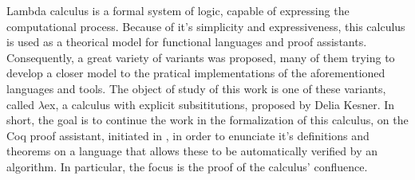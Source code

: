 Lambda calculus is a formal system of logic, capable of expressing the computational process.
Because of it's simplicity and expressiveness, this calculus is used as a theorical model
for functional languages and proof assistants. Consequently, a great variety of variants
was proposed, many of them trying to develop a closer model to the pratical implementations
of the aforementioned languages and tools.
The object of study of this work is one of these variants, called $\lambda$ex, 
a calculus with explicit subsititutions, proposed by Delia Kesner.
In short, the goal is to continue the work in the formalization of this calculus, 
on the Coq proof assistant, initiated in \cite{initial}, in order to
enunciate it's definitions and theorems on a language that allows these to be automatically
verified by an algorithm.
In particular, the focus is the proof of the calculus' confluence.
